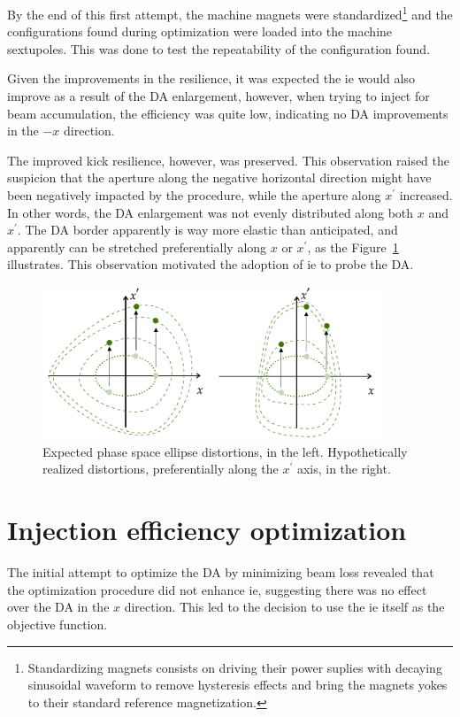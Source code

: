 By the end of this first attempt, the machine magnets were standardized\footnote{Standardizing magnets consists on driving their power suplies with decaying sinusoidal waveform to remove hysteresis effects and bring the magnets yokes to their standard reference magnetization.} and the configurations found during optimization were loaded into the machine sextupoles. This was done to test the repeatability of the configuration found.

Given the improvements in the resilience, it was expected the \gls*{ie} would also improve as a result of the \gls*{DA} enlargement, however, when trying to inject for beam accumulation, the efficiency was quite low, indicating no \gls*{DA} improvements in the $-x$ direction.

The improved kick resilience, however, was preserved. This observation raised the suspicion that the aperture along the negative horizontal direction might have been negatively impacted by the procedure, while the aperture along $x^\prime$ increased. In other words, the \gls*{DA} enlargement was not evenly distributed along both $x$ and $x^\prime$. The \gls*{DA} border apparently is way more elastic than anticipated, and apparently can be stretched preferentially along $x$ or $x^\prime$, as the Figure~\ref{fig:expected_vs_reality_DA} illustrates. This observation motivated the adoption of \gls*{ie} to probe the \gls*{DA}.
\begin{figure}[htb]
    \centering
    \includegraphics[width=0.9\textwidth]{Images/elastic_phase_space_distortion.pdf}
    \caption[Expected phase space ellipse distortions vs. hypothetically realized distortions.]{Expected phase space ellipse distortions, in the left. Hypothetically realized distortions, preferentially along the $x^\prime$ axis, in the right.}
    \label{fig:expected_vs_reality_DA}
\end{figure}
\section{Injection efficiency optimization}
\label{sec:injeff_opt}
The initial attempt to optimize the \gls*{DA} by minimizing beam loss revealed that the optimization procedure did not enhance \gls*{ie}, suggesting there was no effect over the \gls*{DA} in the $x$ direction. This led to the decision to use the \gls*{ie} itself as the objective function.

